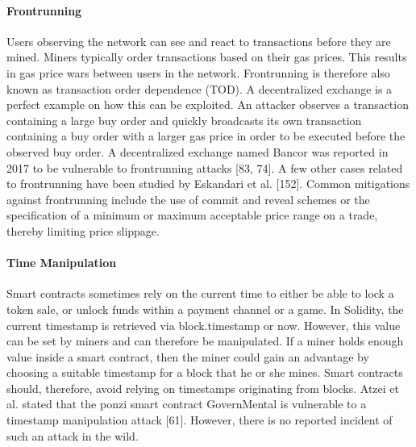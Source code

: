         \paragraph{Frontrunning}
            Users observing the network can see and react to transactions before they are mined. Miners typically order transactions based on their gas prices.
            This results in gas price wars between users in the network.
            Frontrunning is therefore also known as transaction order dependence (TOD).
            A decentralized exchange is a perfect example on how this can be exploited. An attacker observes a transaction containing a large buy order and quickly broadcasts its own transaction containing a buy order with a larger gas price in order to be executed before the observed buy order.
            A decentralized exchange named Bancor was reported in 2017 to be vulnerable to frontrunning attacks [83, 74].
            A few other cases related to frontrunning have been studied by Eskandari et al. [152].
            Common mitigations against frontrunning include the use of commit and reveal schemes or the specification of a minimum or maximum acceptable price range on a trade, thereby limiting price slippage.
        
        \paragraph{Time Manipulation}
            Smart contracts sometimes rely on the current time to either be able to lock a token sale, or unlock funds within a payment channel or a game.
            In Solidity, the current timestamp is retrieved via block.timestamp or now.
            However, this value can be set by miners and can therefore be manipulated.
            If a miner holds enough value inside a smart contract, then the miner could gain an advantage by choosing a suitable timestamp for a block that he or she mines.
            Smart contracts should, therefore, avoid relying on timestamps originating from blocks.
            Atzei et al. stated that the ponzi smart contract GovernMental is vulnerable to a timestamp manipulation attack [61].
            However, there is no reported incident of such an attack in the wild.
        
